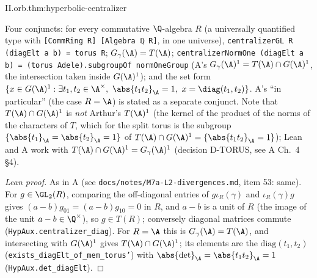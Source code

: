 \begin{theorem}
\end{theorem}
\begin{tfformal}{II.orb.thm:hyperbolic-centralizer}
\begin{tffidelity}
Four conjuncts: for every commutative $\Q$-algebra $R$ (a universally quantified type with \texttt{[CommRing R] [Algebra ℚ R]}, in one universe), \texttt{centralizerGL R (diagElt a b) = torus R}; $G_\gamma(\A)=T(\A)$; \texttt{centralizerNormOne (diagElt a b) = (torus Adele).subgroupOf normOneGroup} (A's $G_\gamma(\A)^1=T(\A)\cap G(\A)^1$, the intersection taken inside $G(\A)^1$); and the set form $\{x\in G(\A)^1:\exists t_1,t_2\in\A^\times,\ \abs{t_1t_2}_\A=1,\ x=\diag(t_1,t_2)\}$. A's ``in particular'' (the case $R=\A$) is stated as a separate conjunct. Note that $T(\A)\cap G(\A)^1$ is \emph{not} Arthur's $T(\A)^1$ (the kernel of the product of the norms of the characters of $T$, which for the split torus is the subgroup $\{\abs{t_1}_\A=\abs{t_2}_\A=1\}$ of $T(\A)\cap G(\A)^1=\{\abs{t_1t_2}_\A=1\}$); Lean and A work with $T(\A)\cap G(\A)^1=G_\gamma(\A)^1$ (decision D-TORUS, see A Ch.~4 §4).
\end{tffidelity}
\end{tfformal}
\begin{proof}[Lean proof]
As in A (see \texttt{docs/notes/M7a-L2-divergences.md}, item 53: same). For $g\in\GL_2(R)$, comparing the off-diagonal entries of $g\iota_R(\gamma)$ and $\iota_R(\gamma)g$ gives $(a-b)g_{01}=(a-b)g_{10}=0$ in $R$, and $a-b$ is a unit of $R$ (the image of the unit $a-b\in\Q^\times$), so $g\in T(R)$; conversely diagonal matrices commute (\texttt{HypAux.centralizer\_diag}). For $R=\A$ this is $G_\gamma(\A)=T(\A)$, and intersecting with $G(\A)^1$ gives $T(\A)\cap G(\A)^1$; its elements are the $\mathrm{diag}(t_1,t_2)$ (\texttt{exists\_diagElt\_of\_mem\_torus'}) with $\abs{\det}_\A=\abs{t_1t_2}_\A=1$ (\texttt{HypAux.det\_diagElt}).
\end{proof}

